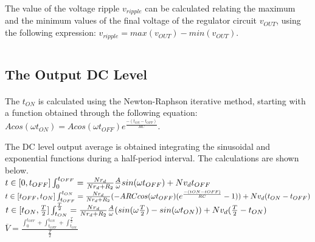 The value of the voltage ripple $v_{ripple}$ can be calculated relating the maximum and the minimum values of the final voltage of the regulator circuit $v_{OUT}$, using the following expression: $v_{ripple}=max(v_{OUT})-min(v_{OUT})$.

\begin{center}
   \begin{tabular}{|c||c|}
      \hline
        
   \end{tabular}
 \end{center}

\subsection{The Output DC Level}
\label{subsec:dclevel}

\paragraph{}
The $t_{ON}$ is calculated using the Newton-Raphson iterative method, starting with a function obtained through the following equation: $Acos(\omega t_{ON})=Acos(\omega t_{OFF})e^{\frac{-(t_{ON}-t_{OFF})}{RC}}$.

The DC level output average is obtained integrating the sinusoidal and exponential functions during a half-period interval. The calculations are shown below.\\

$t\in[0,t_{OFF}]\\
\int_{0}^{t_{OFF}}=\frac{N r_d}{N r_d + R_2}\frac{A}{\omega}sin(\omega t_{OFF})+N v_d t_{OFF}\\$\\

$t\in[t_{OFF},t_{ON}]\\
\int_{t_{OFF}}^{t_{ON}}=\frac{N r_d}{N r_d + R_2}(-A R C cos(\omega t_{OFF})(e^{\frac{-({tON}-{tOFF})}{RC}}-1))+N v_d (t_{ON} - t_{OFF})\\$\\

$t\in[t_{ON},\frac{T}{2}]\\
\int_{t_{ON}}^{\frac{T}{2}}=\frac{N r_d}{N r_d + R_2}\frac{A}{\omega}(sin(\omega \frac{T}{2})-sin(\omega t_{ON}))+N v_d (\frac{T}{2}-t_{ON})\\$\\

$\overline{V}=\frac{\int_{0}^{t_{OFF}}+\int_{t_{OFF}}^{t_{ON}}+\int_{t_{ON}}^{\frac{T}{2}}}{\frac{T}{2}}$

